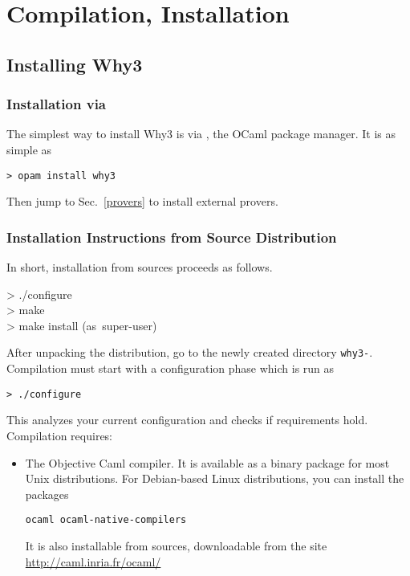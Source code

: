 
\chapter{Compilation, Installation}
\label{sec:install}

\section{Installing Why3}

\subsection{Installation via \opam}

The simplest way to install Why3 is via \opam, the OCaml
package manager. It is as simple as
\begin{verbatim}
> opam install why3
\end{verbatim}
Then jump to Sec.~\ref{provers} to install external provers.

\subsection{Installation Instructions from Source Distribution}

In short, installation from sources proceeds as follows.
\begin{flushleft}\ttfamily
  > ./configure\\
  > make\\
  > make install \mbox{\rmfamily (as super-user)}
\end{flushleft}

After unpacking the distribution, go to the newly created directory
\texttt{why3-\whyversion}. Compilation must start with a
configuration phase which is run as
\begin{verbatim}
> ./configure
\end{verbatim}
This analyzes your current configuration and checks if requirements hold.
Compilation requires:
\begin{itemize}
\item The Objective Caml compiler. It is
  available as a binary package for most Unix distributions. For
  Debian-based Linux distributions, you can install the packages
\begin{verbatim}
ocaml ocaml-native-compilers
\end{verbatim}
It is also installable from sources, downloadable from the site
\url{http://caml.inria.fr/ocaml/}
\end{itemize}

